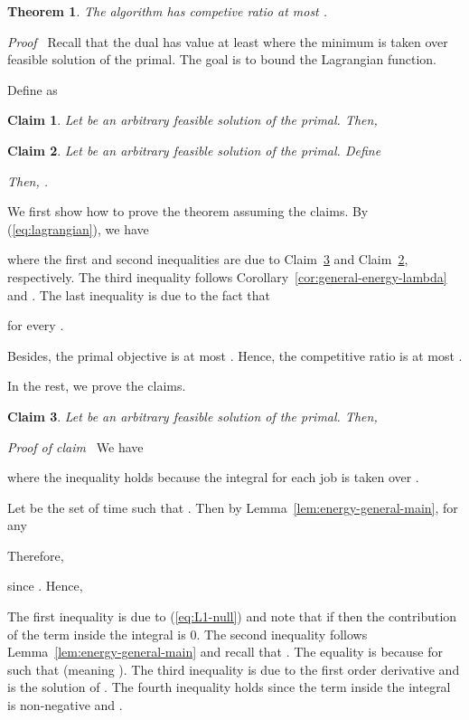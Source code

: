 \documentclass[11pt]{article}
\newenvironment{proof}{\noindent\emph{Proof\ }}{\hspace*{\fill}\medskip}
\newenvironment{claimproof}{\noindent\emph{Proof of claim\ }}{\hspace*{\fill}\medskip}
\newtheorem{theorem}{Theorem}
\newtheorem{claim}{Claim}
\begin{document}
\begin{theorem}
The algorithm has competive ratio at most .
\end{theorem}
\begin{proof}
Recall that the dual has value at least  where the minimum is taken 
over  feasible solution of the primal. The goal is to bound 
the Lagrangian function. 

 Define  as 


\begin{claim}		\label{claim:general-energy-L1}
Let  be an arbitrary feasible solution of the primal. Then,

\end{claim}



\begin{claim}		\label{claim:general-energy-L2}
Let  be an arbitrary feasible solution of the primal. 
Define

Then, .
\end{claim}


We first show how to prove the theorem assuming the claims.
By (\ref{eq:lagrangian}), we have

where the first and second inequalities are due to Claim~\ref{claim:general-energy-L1} and
Claim~\ref{claim:general-energy-L2}, respectively. The third inequality follows
Corollary~\ref{cor:general-energy-lambda} and . 
The last inequality is due to the fact that

for every .

Besides, the primal objective is at most
. 
Hence, the competitive ratio is at most .


In the rest, we prove the claims.

\setcounter{claim}{1}
\begin{claim}		\label{claim:general-energy-L1}
Let  be an arbitrary feasible solution of the primal. Then,

\end{claim}
\begin{claimproof}
We have

where the inequality holds because the integral for each job  is taken over . 

Let  be the set of time  such that 
.
Then by Lemma~\ref{lem:energy-general-main}, for any 

Therefore,

since . Hence, 

The first inequality is due to (\ref{eq:L1-null}) and note that if  then the contribution of the term 
inside the integral is 0. The second inequality follows Lemma~\ref{lem:energy-general-main} and 
recall that  . 
The equality is because 
for  such that  (meaning ).
The third inequality is due to the first order derivative and  is the solution of  
. 
The fourth inequality holds since the term inside the integral is non-negative
and .



\end{claimproof}
\end{proof}
\end{document}
